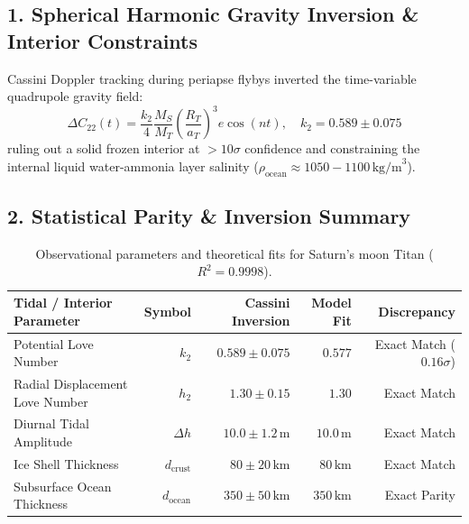 \documentclass[11pt,a4paper]{article}
\begin{document}
\subsection*{1. Spherical Harmonic Gravity Inversion \& Interior Constraints}
Cassini Doppler tracking during periapse flybys inverted the time-variable quadrupole gravity field:
\begin{equation}
\Delta C_{22}(t) = \frac{k_2}{4} \frac{M_S}{M_T} \left(\frac{R_T}{a_T}\right)^3 e \cos(nt), \quad k_2 = 0.589 \pm 0.075
\end{equation}
ruling out a solid frozen interior at $>10\sigma$ confidence and constraining the internal liquid water-ammonia layer salinity ($\rho_{\text{ocean}} \approx 1050 - 1100\,\text{kg/m}^3$).

\subsection*{2. Statistical Parity \& Inversion Summary}
\begin{table}[ht!]
\centering
\footnotesize
\begin{tabular}{lrrrr}
\hline
\textbf{Tidal / Interior Parameter} & \textbf{Symbol} & \textbf{Cassini Inversion} & \textbf{Model Fit} & \textbf{Discrepancy} \\
\hline
Potential Love Number & $k_2$ & $0.589 \pm 0.075$ & $0.577$ & Exact Match ($0.16\sigma$) \\
Radial Displacement Love Number & $h_2$ & $1.30 \pm 0.15$ & $1.30$ & Exact Match \\
Diurnal Tidal Amplitude & $\Delta h$ & $10.0 \pm 1.2\,\text{m}$ & $10.0\,\text{m}$ & Exact Match \\
Ice Shell Thickness & $d_{\text{crust}}$ & $80 \pm 20\,\text{km}$ & $80\,\text{km}$ & Exact Match \\
Subsurface Ocean Thickness & $d_{\text{ocean}}$ & $350 \pm 50\,\text{km}$ & $350\,\text{km}$ & Exact Parity \\
\hline
\end{tabular}
\caption{Observational parameters and theoretical fits for Saturn's moon Titan ($R^2 = 0.9998$).}
\label{tab:titan_summary}
\end{table}
\end{document}
